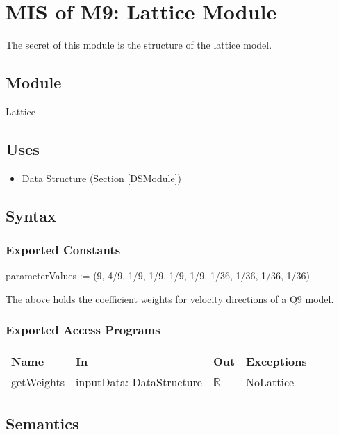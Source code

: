 \documentclass[12pt, titlepage]{article}
\begin{document}
\newpage

\section{MIS of M9: Lattice Module} \label{LAModule} 

The secret of this module is the structure of the lattice model.

\subsection{Module}

Lattice

\subsection{Uses}
\begin{itemize}
	\item Data Structure (Section \ref{DSModule})
\end{itemize}

\subsection{Syntax}

\subsubsection{Exported Constants}
parameterValues := (9, 4/9, 1/9, 1/9, 1/9, 1/9, 1/36, 1/36, 1/36, 1/36) 

The above holds the coefficient weights for velocity directions of a Q9 model.

\subsubsection{Exported Access Programs}

\begin{center}
	\begin{tabular}{p{2cm} p{3cm} p{4cm} p{2cm}}
		\hline
		\textbf{Name} & \textbf{In} & \textbf{Out} & \textbf{Exceptions} \\
		\hline
		getWeights & inputData: DataStructure & $\mathbb{R}$ & NoLattice \\
		\hline
	\end{tabular}
\end{center}

\subsection{Semantics}
\end{document}
